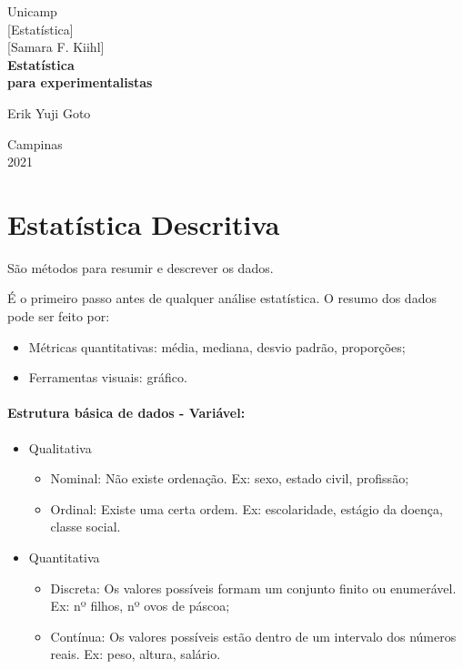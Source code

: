 \documentclass[a4paper, 12pt]{article}
\begin{document}
%
\begin{titlepage} %
	\begin{center} %
		{\large Unicamp}\\[0.2cm] %
		{\large [Estatística]}\\[0.2cm] %
		{\large [Samara F. Kiihl]}\\[3.2cm]
		{\bf \huge Estatística}\\[0.2cm] 
		{\bf \large para experimentalistas}\\[4.9cm]
	\end{center} %
	{\large Erik Yuji Goto}\\[10cm] %
	\begin{center}
		{\large Campinas}\\[0.2cm]
		{\large 2021}
	\end{center}
\end{titlepage} %


\tableofcontents
\newpage

\section{Estatística Descritiva}
	São métodos para resumir e descrever os dados.
	
	É o primeiro passo antes de qualquer análise estatística. O resumo dos dados pode ser feito por:
	\begin{itemize}
		\item Métricas quantitativas: média, mediana, desvio padrão, proporções;
		\item Ferramentas visuais: gráfico.
	\end{itemize}
 
	\paragraph{Estrutura básica de dados - Variável:}
	\begin{itemize}
		\item Qualitativa
			\begin{itemize}
				\item Nominal: Não existe ordenação. Ex: sexo, estado civil, profissão;
				\item Ordinal: Existe uma certa ordem. Ex: escolaridade, estágio da doença, classe social.
			\end{itemize}
		\item Quantitativa
			\begin{itemize}
				\item Discreta: Os valores possíveis formam um conjunto finito ou enumerável. Ex: nº filhos, nº ovos de páscoa;
				\item Contínua: Os valores possíveis estão dentro de um intervalo dos números reais. Ex: peso, altura, salário.
			\end{itemize}
	\end{itemize}
	
\end{document}
